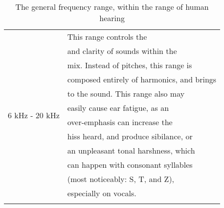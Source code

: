 \begin{longtable}[h!]{| l | l|}
		\hline
		\multirow{12}{*}{6 kHz - 20 kHz} & This range controls the \say{brilliance} \\ & and clarity of sounds within the \\ & mix. Instead of pitches, this range is \\ & composed entirely of harmonics, and brings \\ & \say{sparkle} to the sound. This range also may \\ & easily cause ear fatigue, as an \\ & over-emphasis can increase the \\ & hiss heard, and produce sibilance, or \\ & an unpleasant tonal harshness, which \\ & can happen with consonant syllables \\ & (most noticeably: S, T, and Z), \\ & especially on vocals. \\
		\hline
\caption{The general frequency range, within the range of human hearing} \cite{Suits_1998}\cite{Zjalic_2021}
\label{tbl:frequency-table-of-human-hearing-general}
\end{longtable}